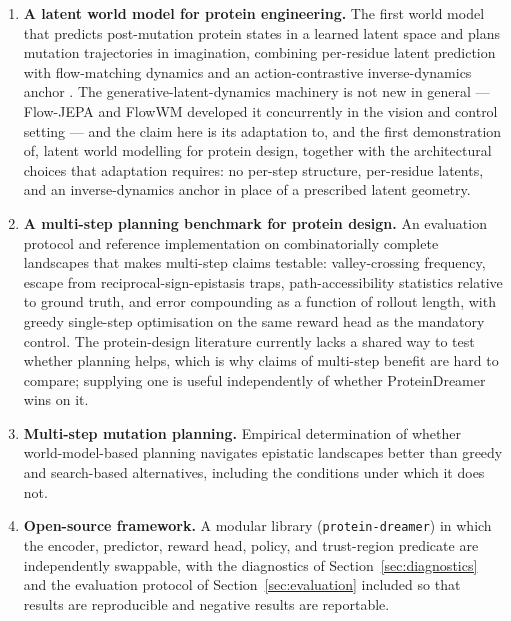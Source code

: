 \documentclass[12pt, a4paper]{article}
\begin{document}
\begin{enumerate}
    \item \textbf{A latent world model for protein engineering.} The first world model that predicts post-mutation protein states in a learned latent space and plans mutation trajectories in imagination, combining per-residue latent prediction with flow-matching dynamics \citep{lipman2023flowmatching, huo2026flowjepa} and an action-contrastive inverse-dynamics anchor \citep{boylan2026nogaussian}. The generative-latent-dynamics machinery is not new in general --- Flow-JEPA and FlowWM developed it concurrently in the vision and control setting --- and the claim here is its adaptation to, and the first demonstration of, latent world modelling for protein design, together with the architectural choices that adaptation requires: no per-step structure, per-residue latents, and an inverse-dynamics anchor in place of a prescribed latent geometry.

    \item \textbf{A multi-step planning benchmark for protein design.} An evaluation protocol and reference implementation on combinatorially complete landscapes \citep{wu2016indirect, johnston2024trpb} that makes multi-step claims testable: valley-crossing frequency, escape from reciprocal-sign-epistasis traps, path-accessibility statistics relative to ground truth, and error compounding as a function of rollout length, with greedy single-step optimisation on the same reward head as the mandatory control. The protein-design literature currently lacks a shared way to test whether planning helps, which is why claims of multi-step benefit are hard to compare; supplying one is useful independently of whether ProteinDreamer wins on it.

    \item \textbf{Multi-step mutation planning.} Empirical determination of whether world-model-based planning navigates epistatic landscapes better than greedy and search-based alternatives, including the conditions under which it does not.

    \item \textbf{Open-source framework.} A modular library (\texttt{protein-dreamer}) in which the encoder, predictor, reward head, policy, and trust-region predicate are independently swappable, with the diagnostics of Section~\ref{sec:diagnostics} and the evaluation protocol of Section~\ref{sec:evaluation} included so that results are reproducible and negative results are reportable.
\end{enumerate}
\end{document}

